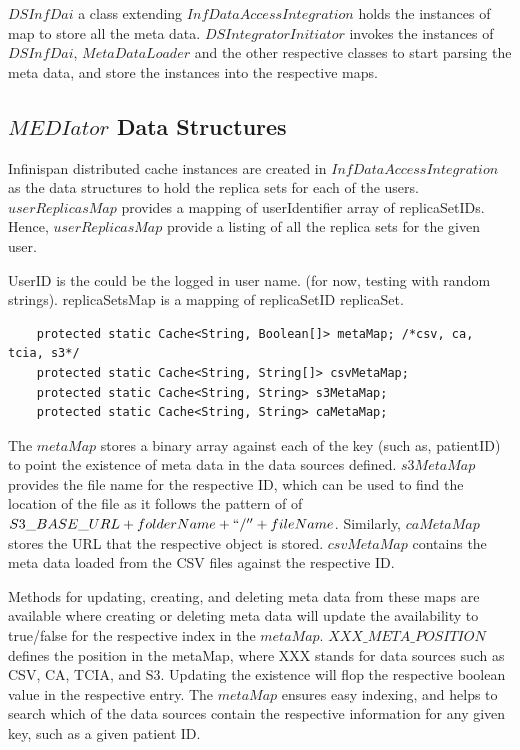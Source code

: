 \documentclass[conference]{IEEEtran}
\begin{document}
$DSInfDai$ a class extending $InfDataAccessIntegration$ holds the instances of map to store all the meta data. $DSIntegratorInitiator$ invokes the instances of $DSInfDai$, $MetaDataLoader$ and the other respective classes to start parsing the meta data, and store the instances into the respective maps. 

\subsection{$MEDIator$ Data Structures}
Infinispan distributed cache instances are created in $InfDataAccessIntegration$ as the data structures to hold the replica sets for each of the users. $userReplicasMap$ provides a mapping of userIdentifier  array of replicaSetIDs. Hence, $userReplicasMap$ provide a listing of all the replica sets for the given user.


UserID is the could be the logged in user name. (for now, testing with random strings).
replicaSetsMap is a mapping of replicaSetID  replicaSet.


\begin{lstlisting}  
    protected static Cache<String, Boolean[]> metaMap; /*csv, ca, tcia, s3*/
    protected static Cache<String, String[]> csvMetaMap;
    protected static Cache<String, String> s3MetaMap;
    protected static Cache<String, String> caMetaMap;
\end{lstlisting} 
The $metaMap$ stores a binary array against each of the key (such as, patientID) to point the existence of meta data in the data sources defined. $s3MetaMap$ provides the file name for the respective ID, which can be used to find the location of the file as it follows the pattern of of $S3\_BASE\_URL + folderName + ``/'' + fileName$. Similarly, $caMetaMap$ stores the URL that the respective object is stored. $csvMetaMap$ contains the meta data loaded from the CSV files against the respective ID.

Methods for updating, creating, and deleting meta data from these maps are available where creating or deleting meta data will update the availability to true/false for the respective index in the $metaMap$. $XXX\_META\_POSITION$ defines the position in the metaMap, where XXX stands for data sources such as CSV, CA, TCIA, and S3. Updating the existence will flop the respective boolean value in the respective entry. The $metaMap$ ensures easy indexing, and helps to search which of the data sources contain the respective information for any given key, such as a given patient ID.
\end{document}
